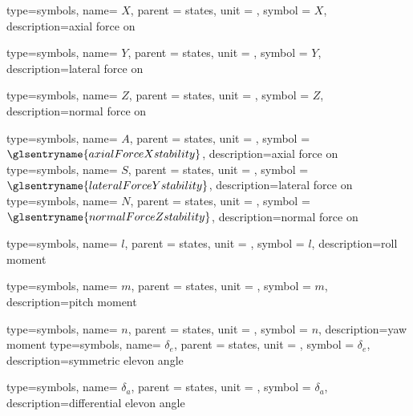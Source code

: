 {type=symbols,
  name= \ensuremath{X},
  parent = {states},
  unit = \unexpanded{\si{\newton}},
  symbol = \ensuremath{X},
  description={axial force on }
}

{type=symbols,
  name= \ensuremath{Y},
  parent = {states},
  unit = \unexpanded{\si{\newton}},
  symbol = \ensuremath{Y},
  description={lateral force on }
}

{type=symbols,
  name= \ensuremath{Z},
  parent = {states},
  unit = \unexpanded{\si{\newton}},
  symbol = \ensuremath{Z},
  description={normal force on }
}

{type=symbols,
  name= \ensuremath{A},
  parent = {states},
  unit = \unexpanded{\si{\newton}},
  symbol = \ensuremath{\glsentryname{axialForceXstability}},
  description={axial force on }
}
{type=symbols,
  name= \ensuremath{S},
  parent = {states},
  unit = \unexpanded{\si{\newton}},
  symbol = \ensuremath{\glsentryname{lateralForceYstability}},
  description={lateral force on }
}
{type=symbols,
  name= \ensuremath{N},
  parent = {states},
  unit = \unexpanded{\si{\newton}},
  symbol = \ensuremath{\glsentryname{normalForceZstability}},
  description={normal force on }
}


{type=symbols,
  name= \ensuremath{l},
  parent = {states},
  unit = \unexpanded{\si{\newton\meter}},
  symbol = \ensuremath{l},
  description={roll moment}
}

{type=symbols,
  name= \ensuremath{m},
  parent = {states},
  unit = \unexpanded{\si{\newton\meter}},
  symbol = \ensuremath{m},
  description={pitch moment}
}

{type=symbols,
  name= \ensuremath{n},
  parent = {states},
  unit = \unexpanded{\si{\newton\meter}},
  symbol = \ensuremath{n},
  description={yaw moment}
}
{type=symbols,
  name= \ensuremath{\delta_{e}},
  parent = {states},
  unit = \unexpanded{\si{\degree}},
  symbol = \ensuremath{\delta_{e}},
  description={symmetric elevon angle}
}

{type=symbols,
  name= \ensuremath{\delta_{a}},
  parent = {states},
  unit = \unexpanded{\si{\degree}},
  symbol = \ensuremath{\delta_{a}},
  description={differential elevon angle}
}

